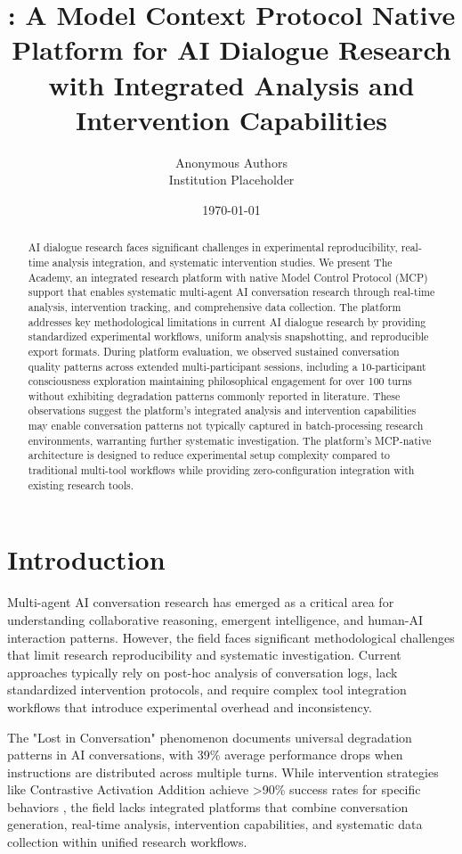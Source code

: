 \documentclass[11pt,letterpaper]{article}
\title{\theacademy{}: A Model Context Protocol Native Platform for AI Dialogue Research with Integrated Analysis and Intervention Capabilities}
\author{
Anonymous Authors \\
Institution Placeholder
}
\date{\today}
\newcommand{\theacademy}{The Academy}
\newcommand{\mcp}{MCP}
\begin{document}
\maketitle

\begin{abstract}
AI dialogue research faces significant challenges in experimental reproducibility, real-time analysis integration, and systematic intervention studies. We present \theacademy{}, an integrated research platform with native Model Control Protocol (\mcp{}) support that enables systematic multi-agent AI conversation research through real-time analysis, intervention tracking, and comprehensive data collection. The platform addresses key methodological limitations in current AI dialogue research by providing standardized experimental workflows, uniform analysis snapshotting, and reproducible export formats. During platform evaluation, we observed sustained conversation quality patterns across extended multi-participant sessions, including a 10-participant consciousness exploration maintaining philosophical engagement for over 100 turns without exhibiting degradation patterns commonly reported in literature. These observations suggest the platform's integrated analysis and intervention capabilities may enable conversation patterns not typically captured in batch-processing research environments, warranting further systematic investigation. The platform's \mcp{}-native architecture is designed to reduce experimental setup complexity compared to traditional multi-tool workflows while providing zero-configuration integration with existing research tools.
\end{abstract}

\section{Introduction}

Multi-agent AI conversation research has emerged as a critical area for understanding collaborative reasoning, emergent intelligence, and human-AI interaction patterns. However, the field faces significant methodological challenges that limit research reproducibility and systematic investigation. Current approaches typically rely on post-hoc analysis of conversation logs, lack standardized intervention protocols, and require complex tool integration workflows that introduce experimental overhead and inconsistency.

The "Lost in Conversation" phenomenon \citep{laban2025lost} documents universal degradation patterns in AI conversations, with 39\% average performance drops when instructions are distributed across multiple turns. While intervention strategies like Contrastive Activation Addition achieve >90\% success rates for specific behaviors \citep{panickssery2024activation}, the field lacks integrated platforms that combine conversation generation, real-time analysis, intervention capabilities, and systematic data collection within unified research workflows.
\end{document}

